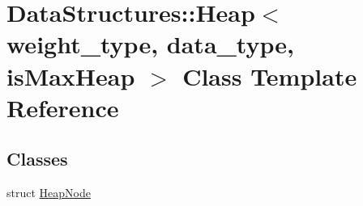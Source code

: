 \hypertarget{class_data_structures_1_1_heap}{\section{Data\-Structures\-:\-:Heap$<$ weight\-\_\-type, data\-\_\-type, is\-Max\-Heap $>$ Class Template Reference}
\label{class_data_structures_1_1_heap}
}
\subsection*{Classes}
\begin{DoxyCompactItemize}
\item 
struct \hyperlink{struct_data_structures_1_1_heap_1_1_heap_node}{Heap\-Node}
\end{DoxyCompactItemize}
